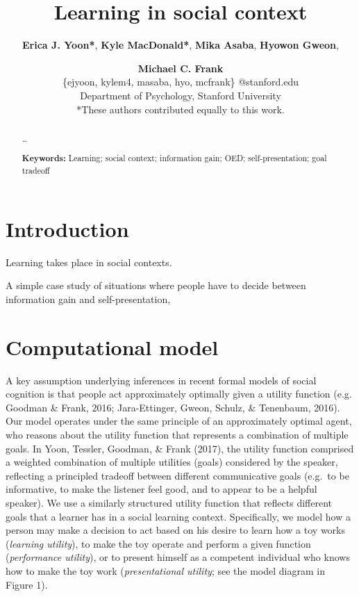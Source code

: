 \documentclass[10pt, letterpaper]{article}
\title{Learning in social context}
\author{{\large \bf Erica J. Yoon*}, {\large \bf Kyle MacDonald*}, {\large \bf Mika Asaba}, {\large \bf Hyowon Gweon}, \and {\large \bf Michael C. Frank} \\ \{ejyoon, kylem4, masaba, hyo, mcfrank\} @stanford.edu \\ Department of Psychology, Stanford University \\ *These authors contributed equally to this work.}
\begin{document}
\maketitle

\begin{abstract}
\ldots{}

\textbf{Keywords:}
Learning; social context; information gain; OED; self-presentation; goal
tradeoff
\end{abstract}

\section{Introduction}\label{introduction}

Learning takes place in social contexts.

A simple case study of situations where people have to decide between
information gain and self-presentation,

\section{Computational model}\label{computational-model}

A key assumption underlying inferences in recent formal models of social
cognition is that people act approximately optimally given a utility
function (e.g. Goodman \& Frank, 2016; Jara-Ettinger, Gweon, Schulz, \&
Tenenbaum, 2016). Our model operates under the same principle of an
approximately optimal agent, who reasons about the utility function that
represents a combination of multiple goals. In Yoon, Tessler, Goodman,
\& Frank (2017), the utility function comprised a weighted combination
of multiple utilities (goals) considered by the speaker, reflecting a
principled tradeoff between different communicative goals (e.g.~to be
informative, to make the listener feel good, and to appear to be a
helpful speaker). We use a similarly structured utility function that
reflects different goals that a learner has in a social learning
context. Specifically, we model how a person may make a decision to act
based on his desire to learn how a toy works (\emph{learning utility}),
to make the toy operate and perform a given function (\emph{performance
utility}), or to present himself as a competent individual who knows how
to make the toy work (\emph{presentational utility}; see the model
diagram in Figure 1).
\end{document}
